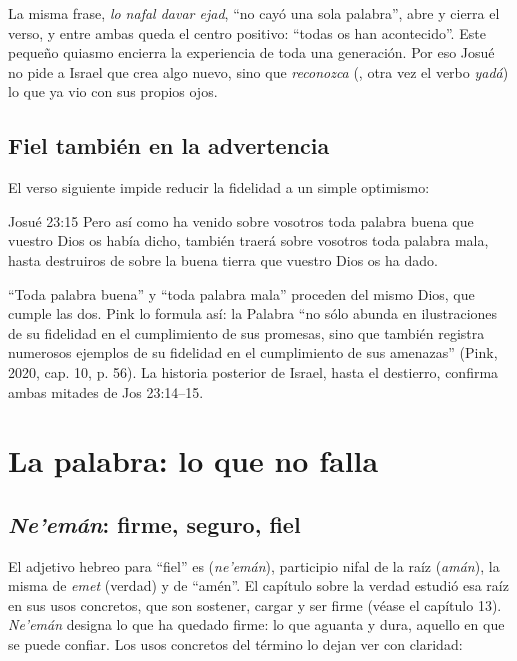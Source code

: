 La misma frase, \emph{lo nafal davar ejad}, ``no cayó una sola palabra'', abre y cierra el verso, y entre ambas queda el centro positivo: ``todas os han acontecido''. Este pequeño quiasmo encierra la experiencia de toda una generación. Por eso Josué no pide a Israel que crea algo nuevo, sino que \emph{reconozca} (, otra vez el verbo \emph{yadá}) lo que ya vio con sus propios ojos.

\subsection{Fiel también en la advertencia}
El verso siguiente impide reducir la fidelidad a un simple optimismo:

\begin{verso}{Josué 23:15}
Pero así como ha venido sobre vosotros toda palabra buena que \SENOR{} vuestro Dios os había dicho, también traerá \SENOR{} sobre vosotros toda palabra mala, hasta destruiros de sobre la buena tierra que \SENOR{} vuestro Dios os ha dado.
\end{verso}

``Toda palabra buena'' y ``toda palabra mala'' proceden del mismo Dios, que cumple las dos. Pink lo formula así: la Palabra ``no sólo abunda en ilustraciones de su fidelidad en el cumplimiento de sus promesas, sino que también registra numerosos ejemplos de su fidelidad en el cumplimiento de sus amenazas'' (Pink, 2020, cap. 10, p. 56). La historia posterior de Israel, hasta el destierro, confirma ambas mitades de Jos 23:14--15.

\section{La palabra: lo que no falla}

\subsection{\emph{Ne'emán}: firme, seguro, fiel}
El adjetivo hebreo para ``fiel'' es  (\emph{ne'emán}), participio nifal de la raíz  (\emph{amán}), la misma de \emph{emet} (verdad) y de ``amén''. El capítulo sobre la verdad estudió esa raíz en sus usos concretos, que son sostener, cargar y ser firme (véase el capítulo 13). \emph{Ne'emán} designa lo que ha quedado firme: lo que aguanta y dura, aquello en que se puede confiar. Los usos concretos del término lo dejan ver con claridad:

